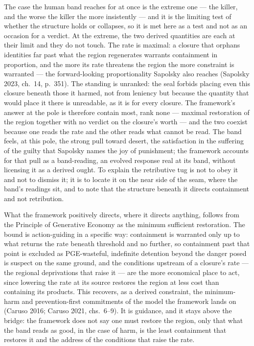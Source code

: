 \documentclass[11pt,oneside]{report}
\theoremstyle{definition}
\theoremstyle{remark}
\begin{document}
The case the human band reaches for at once is the extreme one --- the killer, and the worse the killer the more insistently --- and it is the limiting test of whether the structure holds or collapses, so it is met here as a test and not as an occasion for a verdict. At the extreme, the two derived quantities are each at their limit and they do not touch. The rate is maximal: a closure that orphans identities far past what the region regenerates warrants containment in proportion, and the more its rate threatens the region the more constraint is warranted --- the forward-looking proportionality Sapolsky also reaches (Sapolsky 2023, ch.~14, p.~351). The standing is unranked: the seal forbids placing even this closure beneath those it harmed, not from leniency but because the quantity that would place it there is unreadable, as it is for every closure. The framework's answer at the pole is therefore contain most, rank none --- maximal restoration of the region together with no verdict on the closure's worth --- and the two coexist because one reads the rate and the other reads what cannot be read. The band feels, at this pole, the strong pull toward desert, the satisfaction in the suffering of the guilty that Sapolsky names the joy of punishment; the framework accounts for that pull as a band-reading, an evolved response real at its band, without licensing it as a derived ought. To explain the retributive tug is not to obey it and not to dismiss it; it is to locate it on the near side of the seam, where the band's readings sit, and to note that the structure beneath it directs containment and not retribution.

What the framework positively directs, where it directs anything, follows from the Principle of Generative Economy as the minimum sufficient restoration. The bound is action-guiding in a specific way: containment is warranted only up to what returns the rate beneath threshold and no further, so containment past that point is excluded as PGE-wasteful, indefinite detention beyond the danger posed is suspect on the same ground, and the conditions upstream of a closure's rate --- the regional deprivations that raise it --- are the more economical place to act, since lowering the rate at its source restores the region at less cost than containing its products. This recovers, as a derived constraint, the minimum-harm and prevention-first commitments of the model the framework lands on (Caruso 2016; Caruso 2021, chs.~6--9). It is guidance, and it stays above the bridge: the framework does not say one must restore the region, only that what the band reads as good, in the case of harm, is the least containment that restores it and the address of the conditions that raise the rate.
\end{document}
